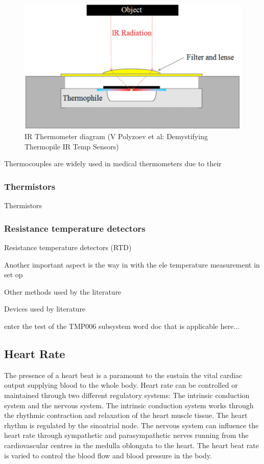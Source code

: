  \begin{figure}
   \centering
   \includegraphics[scale=0.3]{figs/IR_Thermometer}
   \caption{IR Thermometer diagram (V Polyzoev et al: Demystifying Thermopile IR Temp Sensors)}
   \label{fig:IR_Thermometer}
\end{figure}


Thermocouples are widely used in medical thermometers due to their 

\subsubsection{Thermistors}
Thermistors

\subsubsection{Resistance temperature detectors}
Resistance temperature detectors (RTD) 






Another important aspect is the way in with the ele temperature measurement in set op 

Other methods used by the literature

Devices used by literature




enter the test of the TMP006 subsystem word doc that is applicable here...

\subsection{Heart Rate}
The presence of a heart beat is a paramount to the sustain the vital cardiac output supplying blood to the whole body. Heart  rate can be controlled or maintained through two different regulatory systems: The intrinsic conduction system and the nervous system. The intrinsic conduction system works through the rhythmic contraction and relaxation of the heart muscle tissue. The heart rhythm is regulated by the sinoatrial node. The nervous system can influence the heart rate through sympathetic and parasympathetic nerves running from the cardiovascular centres in the medulla oblongata to the heart. The heart beat rate is varied to control the blood flow and blood pressure in the body.

